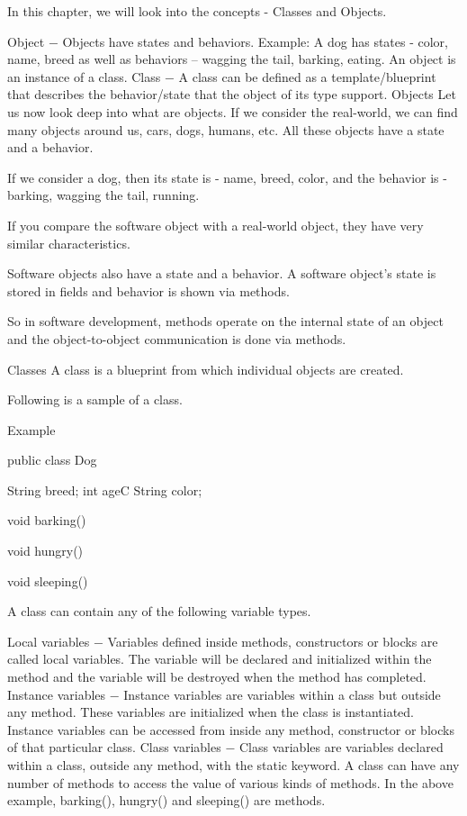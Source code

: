 In this chapter, we will look into the concepts - Classes and Objects.

Object − Objects have states and behaviors. Example: A dog has states - color, name, breed as well as behaviors – wagging the tail, barking, eating. An object is an instance of a class.
Class − A class can be defined as a template/blueprint that describes the behavior/state that the object of its type support.
Objects
Let us now look deep into what are objects. If we consider the real-world, we can find many objects around us, cars, dogs, humans, etc. All these objects have a state and a behavior.

If we consider a dog, then its state is - name, breed, color, and the behavior is - barking, wagging the tail, running.

If you compare the software object with a real-world object, they have very similar characteristics.

Software objects also have a state and a behavior. A software object's state is stored in fields and behavior is shown via methods.

So in software development, methods operate on the internal state of an object and the object-to-object communication is done via methods.

Classes
A class is a blueprint from which individual objects are created.

Following is a sample of a class.

Example

public class Dog {
   String breed;
   int ageC
   String color;

   void barking() {
   }

   void hungry() {
   }

   void sleeping() {
   }
}
A class can contain any of the following variable types.

Local variables − Variables defined inside methods, constructors or blocks are called local variables. The variable will be declared and initialized within the method and the variable will be destroyed when the method has completed.
Instance variables − Instance variables are variables within a class but outside any method. These variables are initialized when the class is instantiated. Instance variables can be accessed from inside any method, constructor or blocks of that particular class.
Class variables − Class variables are variables declared within a class, outside any method, with the static keyword.
A class can have any number of methods to access the value of various kinds of methods. In the above example, barking(), hungry() and sleeping() are methods.

